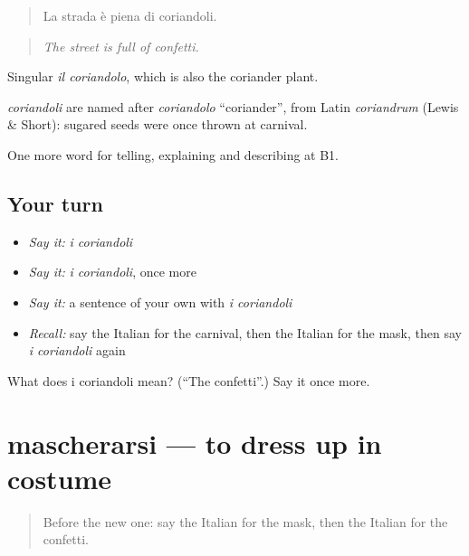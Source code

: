 \begin{quote}
La strada è piena di coriandoli.
\end{quote}

\begin{quote}
\emph{The street is full of confetti.}
\end{quote}

Singular \emph{il coriandolo}, which is also the coriander plant.

\begin{cousinweb}
\emph{coriandoli} are named after \emph{coriandolo} \textquotedblleft{}coriander\textquotedblright{}, from Latin \emph{coriandrum} (Lewis \& Short): sugared seeds were once thrown at carnival.
\end{cousinweb}

\begin{grammarlens}[title={What you've built}]
One more word for telling, explaining and describing at B1.
\end{grammarlens}

\subsection*{Your turn}
\begin{itemize}
\raggedright
  \item \emph{Say it:} \emph{i coriandoli}
  \item \emph{Say it:} \emph{i coriandoli}, once more
  \item \emph{Say it:} a sentence of your own with \emph{i coriandoli}
  \item \emph{Recall:} say the Italian for the carnival, then the Italian for the mask, then say \emph{i coriandoli} again
\end{itemize}

\begin{tcolorbox}[breakable,colback=teal!4,colframe=teal!35!black,title={Before you move on}]
What does i coriandoli mean? (\textquotedblleft{}The confetti\textquotedblright{}.) Say it once more.
\end{tcolorbox}
\section[mascherarsi]{mascherarsi — to dress up in costume}

\label{lesson:IT-C319-mascherarsi}



\begin{quote}
Before the new one: say the Italian for the mask, then the Italian for the confetti.
\end{quote}

